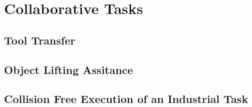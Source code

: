 \chapter{Collaborative Tasks}

\section{Tool Transfer}

\section{Object Lifting Assitance}

\section{Collision Free Execution of an Industrial Task}
